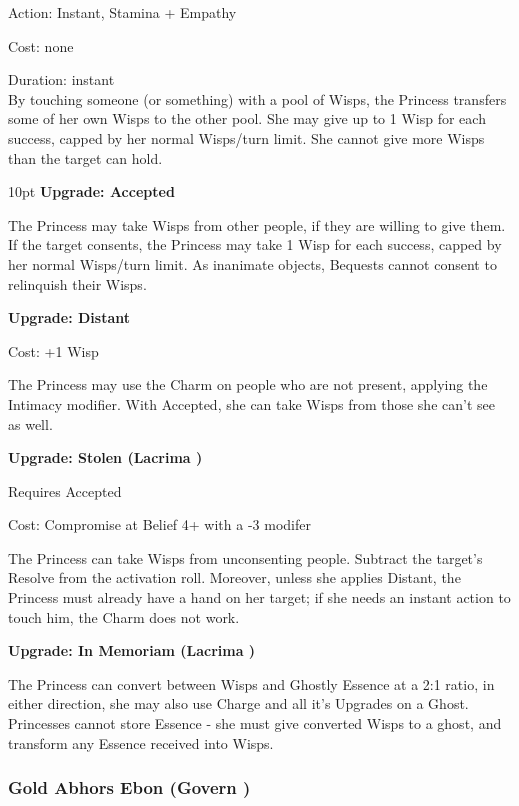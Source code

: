 \noindent Action: Instant, Stamina + Empathy

\noindent Cost: none

\noindent Duration: instant \\

\noindent By touching someone (or something) with a pool of Wisps, the Princess transfers some of her own Wisps to the other pool. She may give up to 1 Wisp for each success, capped by her normal Wisps/turn limit. She cannot give more Wisps than the target can hold.

\begin{myindentpar}{10pt} \textbf{Upgrade: Accepted}

The Princess may take Wisps from other people, if they are willing to give them. If the target consents, the Princess may take 1 Wisp for each success, capped by her normal Wisps/turn limit. As inanimate objects, Bequests cannot consent to relinquish their Wisps. 

\textbf{Upgrade: Distant}

\noindent Cost: +1 Wisp

The Princess may use the Charm on people who are not present, applying the Intimacy modifier. With Accepted, she can take Wisps from those she can't see as well. 

\textbf{Upgrade: Stolen (Lacrima \textbullet\textbullet)}

Requires Accepted

\noindent Cost: Compromise at Belief 4+ with a -3 modifer

The Princess can take Wisps from unconsenting people. Subtract the target's Resolve from the activation roll. Moreover, unless she applies Distant, the Princess must already have a hand on her target; if she needs an instant action to touch him, the Charm does not work.

\textbf{Upgrade: In Memoriam (Lacrima \textbullet\textbullet)}

The Princess can convert between Wisps and Ghostly Essence at a 2:1 ratio, in either direction, she may also use Charge and all it's Upgrades on a Ghost. Princesses cannot store Essence - she must give converted Wisps to a ghost, and transform any Essence received into Wisps.\end{myindentpar}

\subsubsection*{Gold Abhors Ebon (Govern \textbullet\textbullet)}

